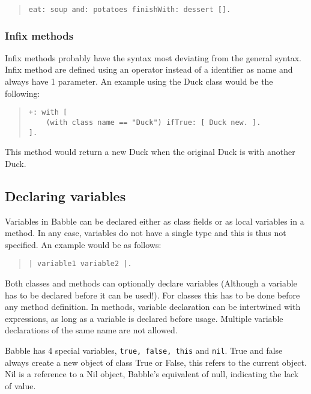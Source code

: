 \documentclass[a4paper]{article}
\begin{document}
\begin{quote}
\begin{lstlisting}
eat: soup and: potatoes finishWith: dessert [].
\end{lstlisting}
\end{quote}

\subsubsection{Infix methods}

Infix methods probably have the syntax most deviating from the general syntax. Infix method are defined using an operator instead of a identifier as name and always have 1 parameter. An example using the Duck class would be the following:

\begin{quote}
\begin{lstlisting}
+: with [
	(with class name == "Duck") ifTrue: [ Duck new. ].
].
\end{lstlisting}
\end{quote}
This method would return a new Duck when the original Duck is with another Duck.

\subsection{Declaring variables}
Variables in Babble can be declared either as class fields or as local variables in a method. In any case, variables do not have a single type and this is thus not specified. An example would be as follows:
\begin{quote}
\begin{lstlisting}
| variable1 variable2 |.
\end{lstlisting}
\end{quote}

Both classes and methods can optionally declare variables (Although a variable has to be declared before it can be used!). For classes this has to be done before any method definition. In methods, variable declaration can be intertwined with expressions, as long as a variable is declared before usage. Multiple variable declarations of the same name are not allowed.

Babble has 4 special variables, \verb|true, false, this| and \verb|nil|. True and false always create a new object of class True or False, this refers to the current object. Nil is a reference to a Nil object, Babble's equivalent of null, indicating the lack of value.
\end{document}
